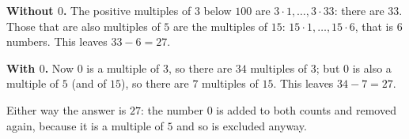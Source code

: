 \textbf{Without $0$.} The positive multiples of $3$ below $100$ are $3\cdot1,\dots,3\cdot33$: there are $33$. Those that are also multiples of $5$ are the multiples of $15$: $15\cdot1,\dots,15\cdot6$, that is $6$ numbers. This leaves $33-6=27$.

\textbf{With $0$.} Now $0$ is a multiple of $3$, so there are $34$ multiples of $3$; but $0$ is also a multiple of $5$ (and of $15$), so there are $7$ multiples of $15$. This leaves $34-7=27$.

Either way the answer is $\boxed{27}$: the number $0$ is added to both counts and removed again, because it is a multiple of $5$ and so is excluded anyway.
